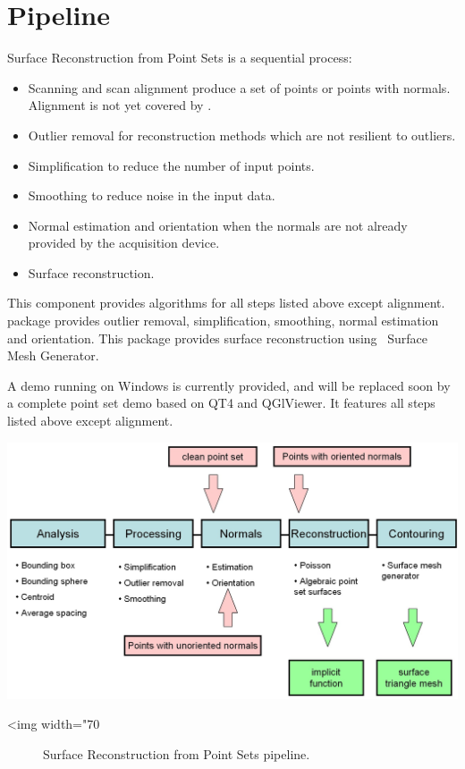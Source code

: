 \section{Pipeline}

Surface Reconstruction from Point Sets is a sequential process:

\begin{itemize}
\item Scanning and scan alignment produce a set of points
      or points with normals. Alignment is not yet
      covered by \cgal.
\item Outlier removal for reconstruction methods which
      are not resilient to outliers.
\item Simplification to reduce the number of input points.
\item Smoothing to reduce noise in the input data.
\item Normal estimation and orientation when the normals
      are not already provided by the acquisition device.
\item Surface reconstruction.
\end{itemize}

This component provides algorithms for all steps listed above except alignment.
 package provides outlier removal, simplification, smoothing,
normal estimation and orientation.
This package provides surface reconstruction using \cgal\ Surface Mesh Generator.

A demo running on Windows is currently provided,
and will be replaced soon by a complete point set demo based on QT4 and QGlViewer.
It features all steps listed above except alignment.

\begin{center}
    \label{Surface_reconstruction_points_3-fig-pipeline}
    \begin{ccTexOnly}
        \includegraphics[width=1.0\textwidth]{Surface_reconstruction_points_3/pipeline} %
    \end{ccTexOnly}
    \begin{ccHtmlOnly}
        <img width="70%
    \end{ccHtmlOnly}
    \begin{figure}[h]
        \caption{Surface Reconstruction from Point Sets pipeline.}
    \end{figure}
\end{center}


